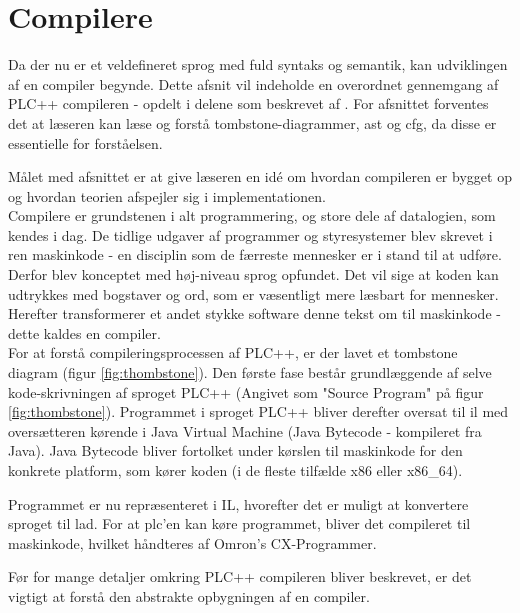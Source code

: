\section{Compilere}
Da der nu er et veldefineret sprog med fuld syntaks og semantik, kan udviklingen af en compiler begynde. Dette afsnit vil indeholde en overordnet gennemgang af PLC++ compileren - opdelt i delene som beskrevet af \textcite{CraftingCompiler_2009}. 
For afsnittet forventes det at læseren kan læse og forstå tombstone-diagrammer, \acrlong{ast} og \acrlong{cfg}, da disse er essentielle for forståelsen.

Målet med afsnittet er at give læseren en idé om hvordan compileren er bygget op og hvordan teorien afspejler sig i implementationen.\\

\noindent Compilere er grundstenen i alt programmering, og store dele af datalogien, som kendes i dag. De tidlige udgaver af programmer og styresystemer blev skrevet i ren maskinkode - en disciplin som de færreste mennesker er i stand til at udføre. Derfor blev konceptet med høj-niveau sprog opfundet. Det vil sige at koden kan udtrykkes med bogstaver og ord, som er væsentligt mere læsbart for mennesker. Herefter transformerer et andet stykke software denne tekst om til maskinkode - dette kaldes en compiler. \\

\noindent For at forstå compileringsprocessen af PLC++, er der lavet et tombstone diagram (figur \ref{fig:thombstone}). Den første fase består grundlæggende af selve kode-skrivningen af sproget PLC++ (Angivet som "Source Program" på figur \ref{fig:thombstone}). Programmet i sproget PLC++ bliver derefter oversat til \gls{il} med oversætteren kørende i Java Virtual Machine (Java Bytecode - kompileret fra Java). Java Bytecode bliver fortolket under kørslen til maskinkode for den konkrete platform, som kører koden (i de fleste tilfælde x86 eller x86\_64).

Programmet er nu repræsenteret i IL, hvorefter det er muligt at konvertere sproget til \gls{lad}. For at \gls{plc}'en kan køre programmet, bliver det compileret til maskinkode, hvilket håndteres af Omron's CX-Programmer.


\noindent Før for mange detaljer omkring PLC++ compileren bliver beskrevet, er det vigtigt at forstå den abstrakte opbygningen af en compiler. %

